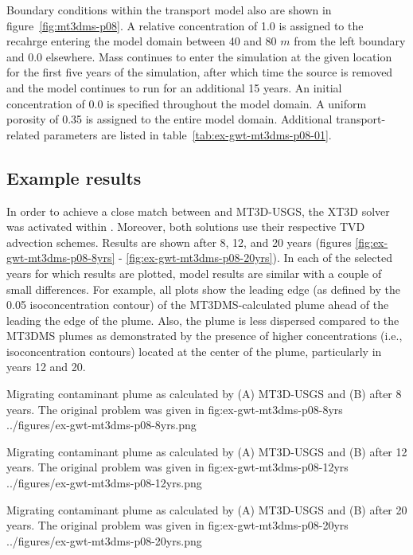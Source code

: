 Boundary conditions within the transport model also are shown in figure~\ref{fig:mt3dms-p08}.  A relative concentration of 1.0 is assigned to the recahrge entering the model domain between 40 and 80 $m$ from the left boundary and 0.0 elsewhere.  Mass continues to enter the simulation at the given location for the first five years of the simulation, after which time the source is removed and the model continues to run for an additional 15 years.  An initial concentration of 0.0 is specified throughout the model domain.  A uniform porosity of 0.35 is assigned to the entire model domain.  Additional transport-related parameters are listed in table~\ref{tab:ex-gwt-mt3dms-p08-01}.

\subsection{Example results}

In order to achieve a close match between \mf and MT3D-USGS, the XT3D solver was activated within \mf.  Moreover, both solutions use their respective TVD advection schemes.  Results are shown after 8, 12, and 20 years (figures \ref{fig:ex-gwt-mt3dms-p08-8yrs} - \ref{fig:ex-gwt-mt3dms-p08-20yrs}).  In each of the selected years for which results are plotted, model results are similar with a couple of small differences.  For example, all plots show the leading edge (as defined by the 0.05 isoconcentration contour) of the MT3DMS-calculated plume ahead of the leading the edge of the \mf plume.  Also, the \mf plume is less dispersed compared to the MT3DMS plumes as demonstrated by the presence of higher concentrations (i.e., isoconcentration contours) located at the center of the plume, particularly in years 12 and 20.

\begin{StandardFigure}
	{Migrating contaminant plume as calculated by (A) MT3D-USGS and (B) \mf after 8 years.  The original problem was given in \citep{sudicky1989}} 
	{fig:ex-gwt-mt3dms-p08-8yrs}
	{../figures/ex-gwt-mt3dms-p08-8yrs.png}
\end{StandardFigure}

\begin{StandardFigure}
	{Migrating contaminant plume as calculated by (A) MT3D-USGS and (B) \mf after 12 years.  The original problem was given in \citep{sudicky1989}} 
	{fig:ex-gwt-mt3dms-p08-12yrs}
	{../figures/ex-gwt-mt3dms-p08-12yrs.png}
\end{StandardFigure}

\begin{StandardFigure}
	{Migrating contaminant plume as calculated by (A) MT3D-USGS and (B) \mf after 20 years.  The original problem was given in \citep{sudicky1989}} 
	{fig:ex-gwt-mt3dms-p08-20yrs}
	{../figures/ex-gwt-mt3dms-p08-20yrs.png}
\end{StandardFigure}
